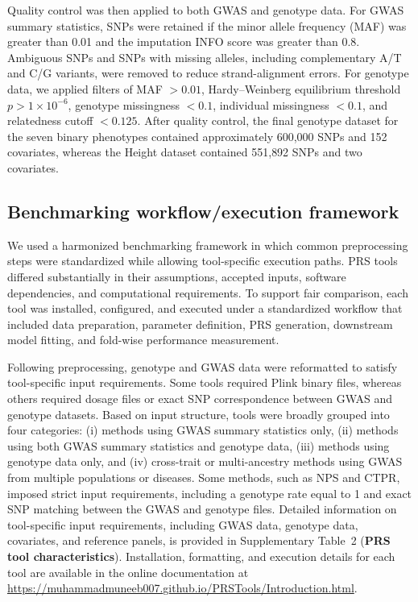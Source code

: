 \documentclass[pdflatex,sn-basic]{sn-jnl}
\begin{document}
Quality control was then applied to both GWAS and genotype data. For GWAS summary statistics, SNPs were retained if the minor allele frequency (MAF) was greater than 0.01 and the imputation INFO score was greater than 0.8. Ambiguous SNPs and SNPs with missing alleles, including complementary A/T and C/G variants, were removed to reduce strand-alignment errors. For genotype data, we applied filters of MAF $> 0.01$, Hardy--Weinberg equilibrium threshold $p > 1 \times 10^{-6}$, genotype missingness $< 0.1$, individual missingness $< 0.1$, and relatedness cutoff $< 0.125$. After quality control, the final genotype dataset for the seven binary phenotypes contained approximately 600{,}000 SNPs and 152 covariates, whereas the Height dataset contained 551{,}892 SNPs and two covariates.





\subsection*{Benchmarking workflow/execution framework}

We used a harmonized benchmarking framework in which common preprocessing steps were standardized while allowing tool-specific execution paths. PRS tools differed substantially in their assumptions, accepted inputs, software dependencies, and computational requirements. To support fair comparison, each tool was installed, configured, and executed under a standardized workflow that included data preparation, parameter definition, PRS generation, downstream model fitting, and fold-wise performance measurement.

Following preprocessing, genotype and GWAS data were reformatted to satisfy tool-specific input requirements. Some tools required Plink binary files, whereas others required dosage files or exact SNP correspondence between GWAS and genotype datasets. Based on input structure, tools were broadly grouped into four categories: (i) methods using GWAS summary statistics only, (ii) methods using both GWAS summary statistics and genotype data, (iii) methods using genotype data only, and (iv) cross-trait or multi-ancestry methods using GWAS from multiple populations or diseases. Some methods, such as NPS and CTPR, imposed strict input requirements, including a genotype rate equal to 1 and exact SNP matching between the GWAS and genotype files. Detailed information on tool-specific input requirements, including GWAS data, genotype data, covariates, and reference panels, is provided in Supplementary Table~2 (\textbf{PRS tool characteristics}). Installation, formatting, and execution details for each tool are available in the online documentation at \url{https://muhammadmuneeb007.github.io/PRSTools/Introduction.html}.
\end{document}
